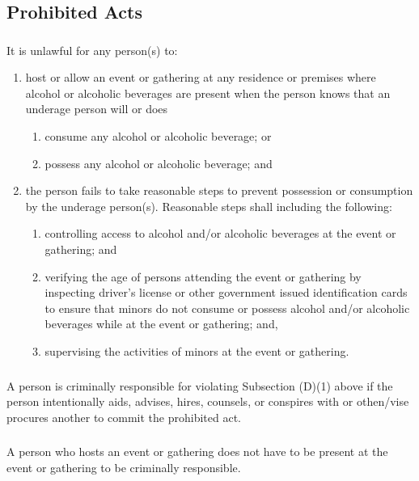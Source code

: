 \subsection{Prohibited Acts}
\subsubsection{}
It is unlawful for any person(s) to:
\begin{enumerate}[{\indent}a)]
    \item host or allow an event or gathering at any residence or premises where alcohol or alcoholic beverages are present when the person knows that an underage person will or does
        \begin{enumerate}
            \item consume any alcohol or alcoholic beverage; or
            \item possess any alcohol or alcoholic beverage; and
        \end{enumerate}
    \item the person fails to take reasonable steps to prevent possession or consumption by the underage person(s). Reasonable steps shall including the following:
        \begin{enumerate}
            \item controlling access to alcohol and/or alcoholic beverages at the event or gathering; and
            \item verifying the age of persons attending the event or gathering by inspecting driver’s license or other government issued identification cards to ensure that minors do not consume or possess alcohol and/or alcoholic beverages while at the event or gathering; and,
            \item supervising the activities of minors at the event or gathering.
        \end{enumerate}
\end{enumerate}
\subsubsection{}
A person is criminally responsible for violating Subsection (D)(1) above if the person intentionally aids, advises, hires, counsels, or conspires with or othen/vise procures another to commit the prohibited act.
\subsubsection{}
A person who hosts an event or gathering does not have to be present at the event or gathering to be criminally responsible.

